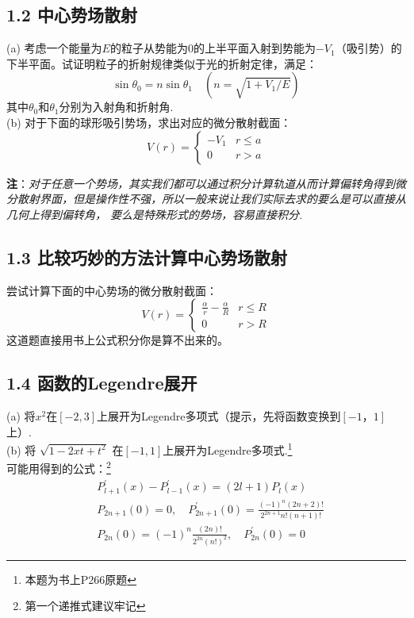\documentclass[UTF8,fontset=windows,oneside]{ctexbook}
\begin{document}
\subsection*{1.2 中心势场散射}
\noindent(a) 考虑一个能量为$E$的粒子从势能为$0$的上半平面入射到势能为$-V_1$（吸引势）的下半平面。试证明粒子的折射规律类似于光的折射定律，满足：
\[\sin \theta_0=n\sin \theta_1\quad(n=\sqrt{1+V_1/E})\]
其中$\theta_0$和$\theta_1$分别为入射角和折射角.\\
(b) 对于下面的球形吸引势场，求出对应的微分散射截面：
\begin{equation*}
    V(r)=
    \begin{cases}
        -V_1 & r\leq a\\
        0 &r>a
    \end{cases}
\end{equation*}

\textbf{注}：{\itshape 对于任意一个势场，其实我们都可以通过积分计算轨道从而计算偏转角得到微分散射界面，但是操作性不强，所以一般来说让我们实际去求的要么是可以直接从几何上得到偏转角，
要么是特殊形式的势场，容易直接积分.}

\subsection*{1.3 比较巧妙的方法计算中心势场散射}
尝试计算下面的中心势场的微分散射截面：
\begin{equation*}
    V(r)=
    \begin{cases}
        \frac{\alpha}{r}-\frac{\alpha}{R} & r\leq R\\
        0 &r>R
    \end{cases}
\end{equation*}
这道题直接用书上公式积分你是算不出来的。

\subsection*{1.4 函数的Legendre展开}
\noindent(a) 将$x^2$在$\left[-2,3\right]$上展开为Legendre多项式（提示，先将函数变换到$\left[-1，1\right]$上）.\\
(b) 将 $\sqrt{1-2xt+t^2}$ 在$\left[-1,1\right]$上展开为Legendre多项式.\footnote{本题为书上P266原题}\\
可能用得到的公式：\footnote{第一个递推式建议牢记}
\begin{align*}
    &P_{l+1}^\prime(x)-P_{l-1}^\prime(x)=(2l+1)P_l(x)\\
    &P_{2n+1}(0)=0,\quad P_{2n+1}^\prime(0)=\frac{(-1)^n(2n+2)!}{2^{2n+1}n!(n+1)!}\\
    &P_{2n}(0)=(-1)^n\frac{(2n)!}{2^{2n}(n!)^2},\quad P^\prime_{2n}(0)=0
\end{align*}
\end{document}
